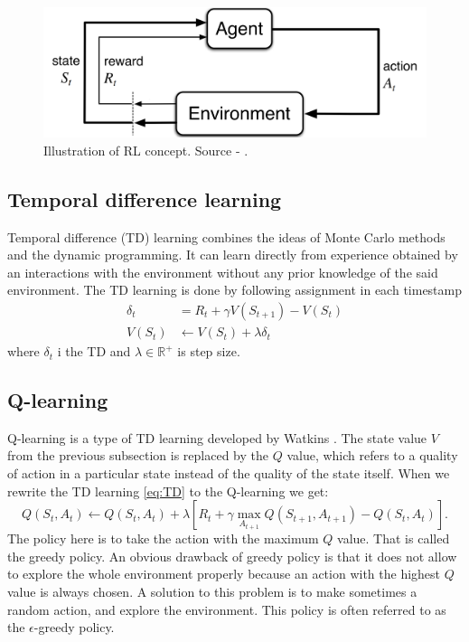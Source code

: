\begin{figure}[!h]
\centering
\includegraphics[scale=0.15]{fig/RL-concept.png}
\caption[RL concept]{Illustration of RL concept. Source - \cite{sutton2012}.}
\label{fig:rlconcept}
\end{figure}


\subsection{Temporal difference learning}
Temporal difference (TD) learning combines the ideas of Monte Carlo methods and the dynamic programming. It can learn directly from experience obtained by an interactions with the environment without any prior knowledge of the said environment. The TD learning is done by following assignment in each timestamp \cite{sutton2012}
\begin{align} \label{eq:TD}
\delta_t &= R_{t} + \gamma V(S_{t+1}) - V(S_t) \\
V(S_t) &\gets V(S_t) + \lambda \delta_t
\end{align}
where $\delta_t$ i the TD and $\lambda \in \mathbb{R}^+$ is step size.

\subsection{Q-learning}
Q-learning is a type of TD learning developed by Watkins \cite{watkins1992}. The state value $V$ from the previous subsection is replaced by the $Q$ value, which refers to a quality of action in a particular state instead of the quality of the state itself. When we rewrite the TD learning \eqref{eq:TD} to the Q-learning we get:
\begin{equation}
Q(S_t, A_t) \gets Q(S_t, A_t) + \lambda [R_{t} + \gamma \underset{A_{t+1}}{\max} Q(S_{t+1}, A_{t+1}) - Q(S_t, A_t)].
\end{equation}
The policy here is to take the action with the maximum $Q$ value. That is called the greedy policy. An obvious drawback of greedy policy is that it does not allow to explore the whole environment properly because an action with the highest $Q$ value is always chosen. A solution to this problem is to make sometimes a random action, and explore the environment. This policy is often referred to as the $\epsilon$-greedy policy.


